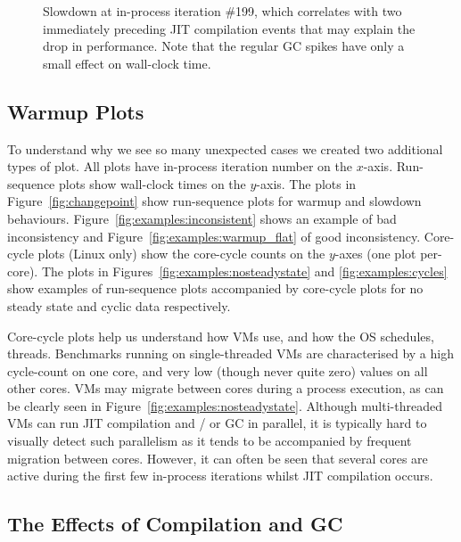 \documentclass[acmsmall]{acmart}\settopmatter{printfolios=true}
\begin{document}
\begin{figure}[!tbp]
\begin{minipage}[t]{0.485\textwidth}
\caption{Slowdown at in-process iteration \#199, which correlates
with two immediately preceding JIT compilation events
that may explain the drop in performance. Note that the
regular GC spikes have only a small effect on wall-clock time.}
\label{fig:examples:slowdown1}
\end{minipage}
\end{figure}

\subsection{Warmup Plots}

To understand why we see so many unexpected cases
we created two additional types of plot. All plots have in-process iteration number on the
$x$-axis. Run-sequence plots show wall-clock times on the $y$-axis. The
plots in Figure~\ref{fig:changepoint} show run-sequence plots for warmup and
slowdown behaviours. Figure~\ref{fig:examples:inconsistent} shows an example of bad inconsistency and
Figure~\ref{fig:examples:warmup_flat} of good inconsistency. Core-cycle plots (Linux only) show the
core-cycle counts on the $y$-axes (one plot per-core). The plots in
Figures~\ref{fig:examples:nosteadystate} and \ref{fig:examples:cycles} show
examples of run-sequence plots accompanied by core-cycle plots for no steady
state and cyclic data respectively.

Core-cycle plots help us understand how VMs use, and how the OS schedules,
threads. Benchmarks running on single-threaded VMs are characterised by a high
cycle-count on one core, and very low (though never quite zero) values on all
other cores. VMs may migrate between cores during a process
execution, as can be clearly seen in Figure~\ref{fig:examples:nosteadystate}.
Although multi-threaded VMs can run JIT compilation and / or GC in parallel,
it is typically hard to visually detect such parallelism as it tends to be
accompanied by frequent migration between cores.
However, it can often be seen that several cores are active during the first few
in-process iterations whilst JIT compilation occurs.


\subsection{The Effects of Compilation and GC}
\label{sec:deepdive}
\end{document}
